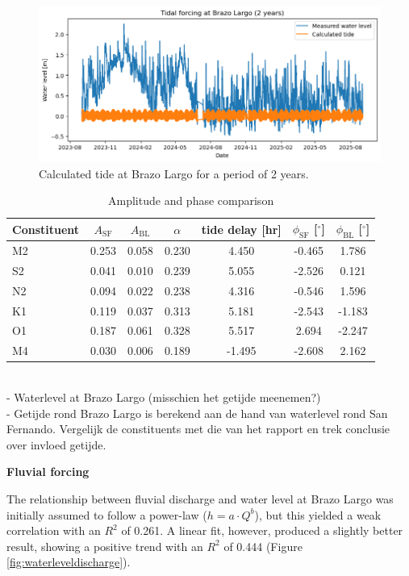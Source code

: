 \begin{figure}[H]
    \centering
    \includegraphics[width=1\linewidth]{figures/ch5/Tide_BL_2y.png}
    \caption{Calculated tide at Brazo Largo for a period of 2 years.}
    \label{fig:placeholder}
\end{figure}

\begin{table}[h!]
\centering
\caption{Amplitude and phase comparison}
\begin{tabular}{lcccccc}
\hline
Constituent & $A_{\text{SF}}$ & $A_{\text{BL}}$ & $\alpha$ & tide delay [hr] & $\phi_{\text{SF}}$ [$^\circ$] & $\phi_{\text{BL}}$ [$^\circ$] \\
\hline
M2 & 0.253 & 0.058 & 0.230 & 4.450 & -0.465 & 1.786 \\
S2 & 0.041 & 0.010 & 0.239 & 5.055 & -2.526 & 0.121 \\
N2 & 0.094 & 0.022 & 0.238 & 4.316 & -0.546 & 1.596 \\
K1 & 0.119 & 0.037 & 0.313 & 5.181 & -2.543 & -1.183 \\
O1 & 0.187 & 0.061 & 0.328 & 5.517 & 2.694 & -2.247 \\
M4 & 0.030 & 0.006 & 0.189 & -1.495 & -2.608 & 2.162 \\
\hline
\end{tabular}
\end{table}



\\- Waterlevel at Brazo Largo
    (misschien het getijde meenemen?)
\\ - Getijde rond Brazo Largo is berekend aan de hand van waterlevel rond San Fernando. Vergelijk de constituents met die van  het rapport en trek conclusie over invloed getijde.

\textbf{Fluvial forcing}

The relationship between fluvial discharge and water level at Brazo Largo was initially assumed to follow a power-law ($h = a \cdot Q^b$), but this yielded a weak correlation with an $R^2$ of 0.261. A linear fit, however, produced a slightly better result, showing a positive trend with an $R^2$ of 0.444 (Figure \ref{fig:waterleveldischarge}).

